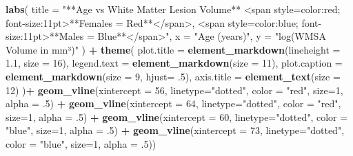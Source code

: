 \documentclass[
]{article}
\newenvironment{Shaded}{\begin{snugshade}}{\end{snugshade}}
\newcommand{\AttributeTok}[1]{\textcolor[rgb]{0.13,0.29,0.53}{#1}}
\newcommand{\DecValTok}[1]{\textcolor[rgb]{0.00,0.00,0.81}{#1}}
\newcommand{\FloatTok}[1]{\textcolor[rgb]{0.00,0.00,0.81}{#1}}
\newcommand{\FunctionTok}[1]{\textcolor[rgb]{0.13,0.29,0.53}{\textbf{#1}}}
\newcommand{\NormalTok}[1]{#1}
\newcommand{\SpecialCharTok}[1]{\textcolor[rgb]{0.81,0.36,0.00}{\textbf{#1}}}
\newcommand{\StringTok}[1]{\textcolor[rgb]{0.31,0.60,0.02}{#1}}
\begin{document}
\begin{Shaded}
\begin{Highlighting}[]
    \FunctionTok{labs}\NormalTok{(}
    \AttributeTok{title =} \StringTok{"**Age vs White Matter Lesion Volume**  }
\StringTok{    \textless{}span style=\textquotesingle{}color:red; font{-}size:11pt\textquotesingle{}\textgreater{}**Females = Red**\textless{}/span\textgreater{},}
\StringTok{    \textless{}span style=\textquotesingle{}color:blue; font{-}size:11pt\textquotesingle{}\textgreater{}**Males = Blue**\textless{}/span\textgreater{}"}\NormalTok{,}
    \AttributeTok{x =} \StringTok{"Age (years)"}\NormalTok{, }\AttributeTok{y =} \StringTok{"log(WMSA Volume in mm³)"}
\NormalTok{  ) }\SpecialCharTok{+}
  \FunctionTok{theme}\NormalTok{(}
    \AttributeTok{plot.title =} \FunctionTok{element\_markdown}\NormalTok{(}\AttributeTok{lineheight =} \FloatTok{1.1}\NormalTok{, }\AttributeTok{size =} \DecValTok{16}\NormalTok{),}
    \AttributeTok{legend.text =} \FunctionTok{element\_markdown}\NormalTok{(}\AttributeTok{size =} \DecValTok{11}\NormalTok{),}
    \AttributeTok{plot.caption =} \FunctionTok{element\_markdown}\NormalTok{(}\AttributeTok{size =} \DecValTok{9}\NormalTok{, }\AttributeTok{hjust=}\NormalTok{ .}\DecValTok{5}\NormalTok{),}
    \AttributeTok{axis.title =} \FunctionTok{element\_text}\NormalTok{(}\AttributeTok{size =} \DecValTok{12}\NormalTok{)}
\NormalTok{  )}\SpecialCharTok{+} \FunctionTok{geom\_vline}\NormalTok{(}\AttributeTok{xintercept =} \DecValTok{56}\NormalTok{, }\AttributeTok{linetype=}\StringTok{"dotted"}\NormalTok{, }\AttributeTok{color =} \StringTok{"red"}\NormalTok{, }\AttributeTok{size=}\DecValTok{1}\NormalTok{, }\AttributeTok{alpha =}\NormalTok{ .}\DecValTok{5}\NormalTok{) }\SpecialCharTok{+} \FunctionTok{geom\_vline}\NormalTok{(}\AttributeTok{xintercept =} \DecValTok{64}\NormalTok{, }\AttributeTok{linetype=}\StringTok{"dotted"}\NormalTok{, }\AttributeTok{color =} \StringTok{"red"}\NormalTok{, }\AttributeTok{size=}\DecValTok{1}\NormalTok{, }\AttributeTok{alpha =}\NormalTok{ .}\DecValTok{5}\NormalTok{) }\SpecialCharTok{+} \FunctionTok{geom\_vline}\NormalTok{(}\AttributeTok{xintercept =} \DecValTok{60}\NormalTok{, }\AttributeTok{linetype=}\StringTok{"dotted"}\NormalTok{, }\AttributeTok{color =} \StringTok{"blue"}\NormalTok{, }\AttributeTok{size=}\DecValTok{1}\NormalTok{, }\AttributeTok{alpha =}\NormalTok{ .}\DecValTok{5}\NormalTok{) }\SpecialCharTok{+} \FunctionTok{geom\_vline}\NormalTok{(}\AttributeTok{xintercept =} \DecValTok{73}\NormalTok{, }\AttributeTok{linetype=}\StringTok{"dotted"}\NormalTok{, }\AttributeTok{color =} \StringTok{"blue"}\NormalTok{, }\AttributeTok{size=}\DecValTok{1}\NormalTok{, }\AttributeTok{alpha =}\NormalTok{ .}\DecValTok{5}\NormalTok{)) }
\end{Highlighting}
\end{Shaded}
\end{document}
